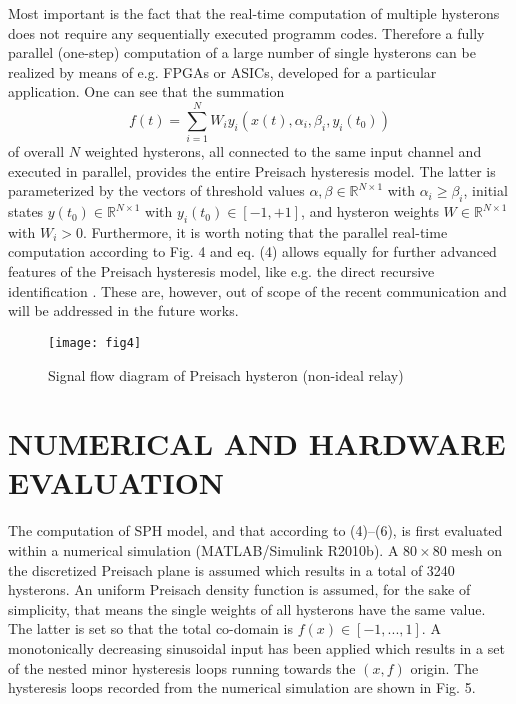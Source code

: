 \documentclass[journal]{IEEEtran}
\begin{document}
Most important is the fact that the real-time computation of
multiple hysterons does not require any sequentially executed
programm codes. Therefore a fully parallel (one-step) computation
of a large number of single hysterons can be realized by means of
e.g. FPGAs or ASICs, developed for a particular application. One
can see that the summation
\begin{equation}\label{6}
f(t)=\sum \limits_{i=1}^{N} W_{i} y_{i}\left(x(t), \alpha_{i},
\beta_{i}, y_{i}(t_{0})\right)
\end{equation}
of overall $N$ weighted hysterons, all connected to the same input
channel and executed in parallel, provides the entire Preisach
hysteresis model. The latter is parameterized by the vectors of
threshold values $\alpha, \beta \in \mathbb{R}^{N\times1}$ with
$\alpha_{i} \geq \beta _{i}$, initial states $y(t_{0})\in
\mathbb{R}^{N\times1}$ with $y_{i}(t_{0}) \in [-1, +1]$, and
hysteron weights $W \in \mathbb{R}^{N\times1}$ with $W_{i}
> 0$. Furthermore, it is worth noting that the parallel real-time computation
according to Fig. 4 and eq. (4) allows equally for further
advanced features of the Preisach hysteresis model, like e.g. the
direct recursive identification \cite{ruderman2013,ruder2015}.
These are, however, out of scope of the recent communication and
will be addressed in the future works.
\begin{figure}[!h]
\centering
\texttt{[image: fig4]}
\caption{Signal flow diagram of Preisach hysteron (non-ideal
relay)} \label{fig:4}
\end{figure}



\section{NUMERICAL AND HARDWARE EVALUATION}
\label{sec:3}


The computation of SPH model, and that according to (4)--(6), is
first evaluated within a numerical simulation (MATLAB/Simulink
R2010b). A $80 \times 80$ mesh on the discretized Preisach plane
is assumed which results in a total of 3240 hysterons. An uniform
Preisach density function is assumed, for the sake of simplicity,
that means the single weights of all hysterons have the same
value. The latter is set so that the total co-domain is $f(x) \in
[-1, ...,1]$. A monotonically decreasing sinusoidal input has been
applied which results in a set of the nested minor hysteresis
loops running towards the $(x,f)$ origin. The hysteresis loops
recorded from the numerical simulation are shown in Fig. 5.
\end{document}
